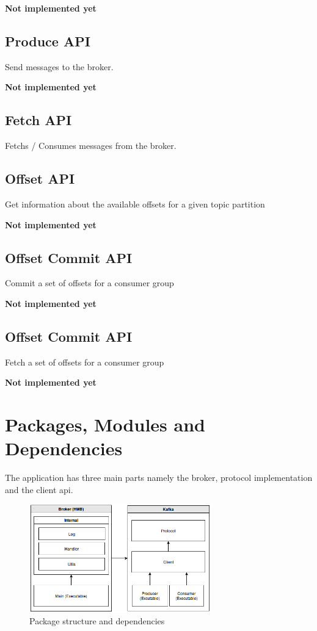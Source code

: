 \textbf{Not implemented yet}

\subsection{Produce API}
Send messages to the broker.

\textbf{Not implemented yet}

\subsection{Fetch API}
Fetchs / Consumes messages from the broker.
\subsection{Offset API}
Get information about the available offsets for a given topic partition

\textbf{Not implemented yet}

\subsection{Offset Commit API}
Commit a set of offsets for a consumer group

\textbf{Not implemented yet}

\subsection{Offset Commit API}
Fetch a set of offsets for a consumer group

\textbf{Not implemented yet}

\section{Packages, Modules and Dependencies}

The application has three main parts namely the broker, protocol implementation
and the client api. 

\begin{figure}[H]
    \centering
   \includegraphics[width=0.7\textwidth]{images/logical-architecture.png}
    \caption{Package structure and dependencies}
    \label{fig:logical-architecture}
\end{figure}


